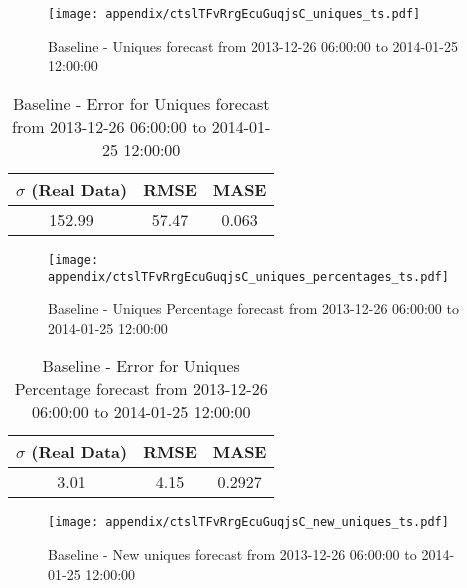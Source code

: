 \begin{figure}[H] \begin{center} \leavevmode
\texttt{[image: appendix/ctslTFvRrgEcuGuqjsC\_uniques\_ts.pdf]} \caption{
Baseline - Uniques forecast from 2013-12-26 06:00:00 to 2014-01-25 12:00:00} \label{fig:appendix/ctslTFvRrgEcuGuqjsC_uniques_ts.pdf} \end{center}
\end{figure}

\begin{table}[H]
\centering
\footnotesize
\begin{tabular}{ccc}
$\sigma$ (Real Data) & RMSE & MASE   \\ \hline
152.99 & 57.47 & 0.063 \\
\end{tabular}

\vspace{0.5cm}

\caption{
Baseline - Error for Uniques forecast from 2013-12-26 06:00:00 to 2014-01-25 12:00:00}
\end{table}

\begin{figure}[H] \begin{center} \leavevmode
\texttt{[image: appendix/ctslTFvRrgEcuGuqjsC\_uniques\_percentages\_ts.pdf]} \caption{
Baseline - Uniques Percentage forecast from 2013-12-26 06:00:00 to 2014-01-25 12:00:00} \label{fig:appendix/ctslTFvRrgEcuGuqjsC_uniques_percentages_ts.pdf} \end{center}
\end{figure}

\begin{table}[H]
\centering
\footnotesize
\begin{tabular}{ccc}
$\sigma$ (Real Data) & RMSE & MASE   \\ \hline
3.01 & 4.15 & 0.2927 \\
\end{tabular}

\vspace{0.5cm}

\caption{
Baseline - Error for Uniques Percentage forecast from 2013-12-26 06:00:00 to 2014-01-25 12:00:00}
\end{table}

\begin{figure}[H] \begin{center} \leavevmode
\texttt{[image: appendix/ctslTFvRrgEcuGuqjsC\_new\_uniques\_ts.pdf]} \caption{
Baseline - New uniques forecast from 2013-12-26 06:00:00 to 2014-01-25 12:00:00} \label{fig:appendix/ctslTFvRrgEcuGuqjsC_new_uniques_ts.pdf} \end{center}
\end{figure}

